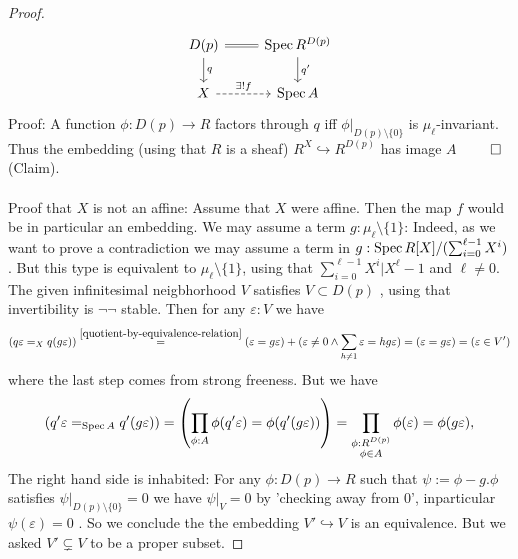\begin{proof}
	\[\begin{tikzcd}
		{D(p)} & {\Spec R^{D(p)}} \\
		X & {\Spec A}
		\arrow[Rightarrow, no head, from=1-1, to=1-2]
		\arrow["q", from=1-1, to=2-1]
		\arrow["q'",from=1-2, to=2-2]
		\arrow["{\exists! f}", dashed, from=2-1, to=2-2]
	\end{tikzcd}\]
	Proof: A function $\phi : D(p) \to R$ factors through $q$ iff $\phi|_{D(p) \setminus\{0\}}$ is $\mu_{\ell}$-invariant. Thus the embedding (using that $R$ is a sheaf) $R^X \hookrightarrow R^{D(p)}$ has image $A$ $\qed$(Claim). 	\\ \\ %
	Proof that $X$ is not an affine:	Assume that $X$ were affine. Then the map $f$ would be in particular an embedding. 
	We may assume a term $g : \mu_\ell \setminus \{1\}$: Indeed, as we want to prove a contradiction we may assume a term in $g : \operatorname{Spec} R[X] / (\sum_{i=0}^{\ell-1} X^i)$. But this type is equivalent to $\mu_\ell \setminus \{1\}$, using that $\sum_{i=0}^{\ell-1} X^i | X^\ell -1 $ and $\ell \neq 0$. \\
	The given infinitesimal neigbhorhood $V$ satisfies $ V \subset D(p)$ , using that invertibility is $\lnot \lnot$ stable.
	Then for any $\varepsilon : V$ we have
	\begin{align*}
		(q\varepsilon =_X q (g \varepsilon)) \overset{\ref{quotient-by-equivalence-relation}}{=} (\varepsilon = g\varepsilon) + (\varepsilon \neq 0 \land \sum_{h \neq 1} \varepsilon = h g \varepsilon) = (\varepsilon = g\varepsilon) = (\varepsilon \in V')
	\end{align*}
	where the last step comes from strong freeness.
	But we have 
	\[(q' \varepsilon =_{\operatorname{Spec} A} q' (g \varepsilon)) = \left (\prod_{\phi : A} \phi(q' \varepsilon) = \phi(q' (g \varepsilon)) \right)= \prod_{\substack{\phi : R^{D(p)} \\ \phi \in A}} \phi (\varepsilon) = \phi(g \varepsilon),\] 
	The right hand side is inhabited: For any $\phi: D(p) \to R$ such that $\psi := \phi - g . \phi$ satisfies $\psi|_{D(p) \setminus \{0\}} =0$  we have $\psi|_V =0$ by 'checking away from 0', inparticular $\psi(\varepsilon) =0$ . 	So we conclude the the embedding $V' \hookrightarrow V$ is an equivalence.  But we asked $V' \subsetneq V$ to be a proper subset.%

\end{proof}

